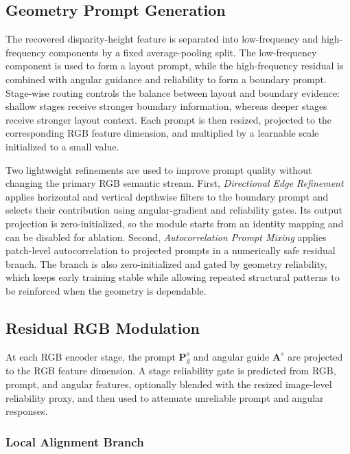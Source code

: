 \documentclass[a4paper,fleqn]{cas-dc}
\begin{document}
\subsection{Geometry Prompt Generation}

The recovered disparity-height feature is separated into low-frequency and high-frequency components by a fixed average-pooling split. The low-frequency component is used to form a layout prompt, while the high-frequency residual is combined with angular guidance and reliability to form a boundary prompt. Stage-wise routing controls the balance between layout and boundary evidence: shallow stages receive stronger boundary information, whereas deeper stages receive stronger layout context. Each prompt is then resized, projected to the corresponding RGB feature dimension, and multiplied by a learnable scale initialized to a small value.

Two lightweight refinements are used to improve prompt quality without changing the primary RGB semantic stream. First, \emph{Directional Edge Refinement} applies horizontal and vertical depthwise filters to the boundary prompt and selects their contribution using angular-gradient and reliability gates. Its output projection is zero-initialized, so the module starts from an identity mapping and can be disabled for ablation. Second, \emph{Autocorrelation Prompt Mixing} applies patch-level autocorrelation to projected prompts in a numerically safe residual branch. The branch is also zero-initialized and gated by geometry reliability, which keeps early training stable while allowing repeated structural patterns to be reinforced when the geometry is dependable.

\subsection{Residual RGB Modulation}

At each RGB encoder stage, the prompt $\mathbf{P}_{g}^{s}$ and angular guide $\mathbf{A}^{s}$ are projected to the RGB feature dimension. A stage reliability gate is predicted from RGB, prompt, and angular features, optionally blended with the resized image-level reliability proxy, and then used to attenuate unreliable prompt and angular responses.

\subsubsection{Local Alignment Branch}
\end{document}
